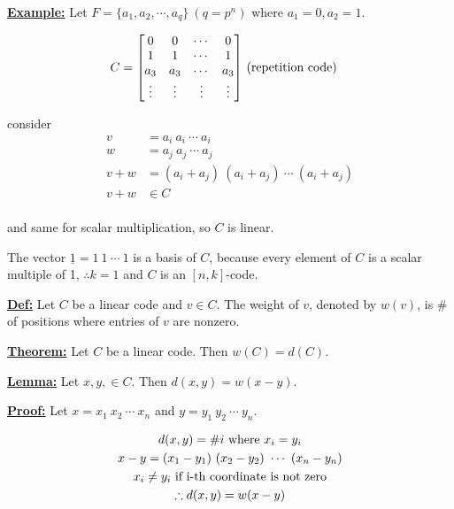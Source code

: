 \documentclass{article}
\newcommand{\eqs}[1]{
	\begin{gather*}
		#1
	\end{gather*}
}
\renewcommand{\b}[1]{\textbf{#1}}
\newcommand{\ul}[1]{\underline{#1}}
\renewcommand{\aligned}[1]{
	\begin{align*}
		#1
	\end{align*}
}
\newcommand{\newdef}[2]{\b{\ul{#1:}} #2}
\begin{document}
\newdef{Example}{
	Let $F = \{a_1, a_2, \cdots, a_q\}\ (q = p^n)$ where
	$a_1 = 0, a_2 = 1$.
	\aligned{
		C = \begin{bmatrix}
			0      & 0      & \cdots & 0      \\
			1      & 1      & \cdots & 1      \\
			a_3    & a_3    & \cdots & a_3    \\
			\vdots & \vdots & \vdots & \vdots \\
		\end{bmatrix} & \textnormal{ (repetition code)}
	}

	consider \aligned{
		v   & = a_i\ a_i\ \cdots\ a_i                   \\
		w   & = a_j\ a_j\ \cdots\ a_j                   \\
		v+w & = (a_i+a_j)\ (a_i+a_j)\ \cdots\ (a_i+a_j) \\
		v+w & \in C                                     \\
	}
	and same for scalar multiplication, so $C$ is linear.
}

The vector $\underline{1} = 1\ 1\ \cdots\ 1$ is a basis of $C$, because every
element of $C$ is a scalar multiple of 1, $\therefore k = 1$ and $C$ is an
$[n, k]$-code.

\newdef{Def}{
	Let $C$ be a linear code and $v \in C$. The weight of $v$, denoted by
	$w(v)$, is \# of positions where entries of $v$ are nonzero.
}

\newdef{Theorem}{Let $C$ be a linear code. Then $w(C) = d(C)$.}

\newdef{Lemma}{Let $x, y, \in C$. Then $d(x, y) = w(x - y)$.}

\newdef{Proof}{
	Let $x = x_1\ x_2\ \cdots\ x_n$ and $y = y_1\ y_2\ \cdots\ y_n$.
	\eqs{
		d(x, y) = \#i \textnormal{ where } x_i = y_i \\
		x - y = (x_1 - y_1)\ (x_2 - y_2)\ \cdots\ (x_n - y_n) \\
		x_i \neq y_i \textnormal{ if i-th coordinate is not zero} \\
		\therefore d(x, y) = w(x - y)
	}
}
\end{document}
